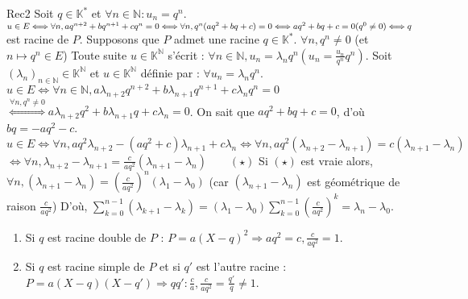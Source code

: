 \documentclass[12pt,a4paper]{report}
\begin{document}
\begin{demonstration}{Rec2}
Soit $q \in \mathbb{K}^*$ et $\forall n \in \mathbb{N} : u_n = q^n$.
\newline $u \in E \Longleftrightarrow \forall n, aq^{n+2}+bq^{n+1}+cq^n=0 \Longleftrightarrow \forall n, q^n(aq^2+bq+c)=0 \Longleftrightarrow aq^2 + bq +c =0 (q^0 \neq 0) \newline \Longleftrightarrow q$ est racine de $P$.
\newline \newline {} Supposons que $P$ admet une racine $q \in \mathbb{K}^*$. $\forall n, q^n \neq 0$ (et $n \mapsto q^n \in E$)
\newline Toute suite $u \in \mathbb{K}^\mathbb{N}$ s'écrit : $\forall n \in \mathbb{N}, u_n = \lambda_n q^n (u_n = \frac{u_n}{q^n}q^n)$.
\newline Soit $(\lambda_n)_{n \in \mathbb{N}} \in \mathbb{K}^\mathbb{N}$ et $u \in \mathbb{K}^\mathbb{N}$ définie par : $\forall u_n = \lambda_n q^n$.
\newline $u \in E \Longleftrightarrow \forall n \in \mathbb{N}, a\lambda_{n+2}q^{n+2} + b\lambda_{n+1}q^{n+1}+c\lambda_nq^n = 0$
\newline $\overset{\forall n, q^n \neq 0}{\Longleftrightarrow}a\lambda_{n+2}q^2+b\lambda_{n+1}q+c\lambda_n = 0$.
\newline On sait que $aq^2 + bq + c = 0$, d'où $bq = -aq^2 - c$.
\newline $u \in E \Longleftrightarrow \forall n, aq^2\lambda_{n+2} - (aq^2+c)\lambda_{n+1} + c\lambda_n \Longleftrightarrow \forall n, aq^2(\lambda_{n+2}-\lambda_{n+1}) = c(\lambda_{n+1}-\lambda_n)$
\newline $\Longleftrightarrow \forall n, \lambda_{n+2}-\lambda_{n+1} = \frac{c}{aq^2}(\lambda_{n+1}-\lambda_n) \qquad (\star)$
\newline Si $(\star)$ est vraie alors, $\forall n, (\lambda_{n+1}-\lambda_n) = \left(\frac{c}{aq^2}\right)^n(\lambda_1-\lambda_0)$ (car $(\lambda_{n+1}-\lambda_n)$ est géométrique de raison $\frac{c}{aq^2}$)
\newline D'où, $\sum_{k=0}^{n-1} (\lambda_{k+1}-\lambda_k) = (\lambda_1-\lambda_0) \sum_{k=0}^{n-1} \left(\frac{c}{aq^2}\right)^k = \lambda_n - \lambda_0$.

\begin{remarque}{}
\begin{enumerate} 
\item Si $q$ est racine double de $P$ : $P = a(X-q)^2 \Longrightarrow aq^2 = c, \frac{c}{aq^2}=1$.
\item Si $q$ est racine simple de $P$ et si $q'$ est l'autre racine : $P = a(X-q)(X-q') \Longrightarrow qq' : \frac{c}{a}, \frac{c}{aq^2} = \frac{q'}{q} \neq 1$.
\end{enumerate}
\end{remarque}




\end{demonstration}
\end{document}
